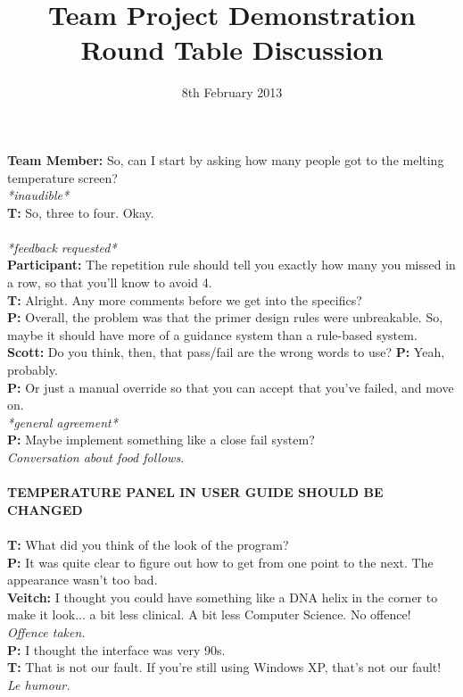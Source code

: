 \documentclass[A4paper]{article}
\title{Team Project Demonstration Round Table Discussion}
\date{8th February 2013}
\begin{document}
\maketitle
\newcommand{\us}{\textbf{T: }}
\newcommand{\pat}{\textbf{P: }}
\newcommand{\pam}{\textbf{Scott: }}
\newcommand{\nic}{\textbf{Veitch: }}
\textbf{Team Member: }So, can I start by asking how many people got to the melting temperature screen?
\\ 
\textit{*inaudible*}\\
\us So, three to four. Okay.\\  \\
\textit{*feedback requested*}\\
\textbf{Participant:} The repetition rule should tell you exactly how many you missed in a row,
so that you'll know to avoid 4.\\
\us Alright. Any more comments before we get into the specifics?\\
\pat Overall, the problem was that the primer design rules were unbreakable. So, maybe it should 
have more of a guidance system than a rule-based system.\\
\pam Do you think, then, that pass/fail are the wrong words to use?
\pat Yeah, probably.\\
\pat Or just a manual override so that you can accept that you've failed, and move on.\\
\textit{*general agreement*}\\
\pat Maybe implement something like a close fail system?\\ 
\textit{Conversation about food follows.}\\ \\
\textbf{TEMPERATURE PANEL IN USER GUIDE SHOULD BE CHANGED}\\ \\
\us What did you think of the look of the program?\\
\pat It was quite clear to figure out how to get from one point to the next. The appearance wasn't too bad.\\
\nic I thought you could have something like a DNA helix in the corner to make it look... a bit less
clinical. A bit less Computer Science. No offence!\\
\textit{Offence taken.}\\
\pat I thought the interface was very 90s.\\
\us That is not our fault. If you're still using Windows XP, that's not our fault!\\
\textit{Le humour.}\\ \\
\end{document}
